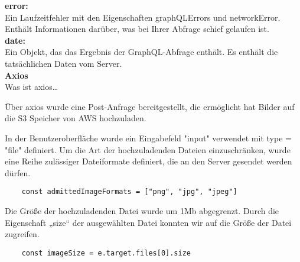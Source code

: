 \textbf{error:}\\
Ein Laufzeitfehler mit den Eigenschaften graphQLErrors und networkError.
Enthält Informationen darüber, was bei Ihrer Abfrage schief gelaufen ist.
\\

\textbf{date:}\\
Ein Objekt, das das Ergebnis der GraphQL-Abfrage enthält.
Es enthält die tatsächlichen Daten vom Server. 
\\


\textbf{Axios} \\

Was ist axios…

Über axios wurde eine Post-Anfrage bereitgestellt, die ermöglicht hat Bilder auf die S3 Speicher von AWS hochzuladen.

In der Benutzeroberfläche wurde ein Eingabefeld "input" verwendet mit type = "file" definiert.
Um die Art der hochzuladenden Dateien einzuschränken, wurde eine Reihe zulässiger Dateiformate definiert, die an den Server gesendet werden dürfen.
\\

\begin{lstlisting}
    const admittedImageFormats = ["png", "jpg", "jpeg"]
\end{lstlisting}
\newline

Die Größe der hochzuladenden Datei wurde um 1Mb abgegrenzt.
Durch die Eigenschaft „size“ der ausgewählten Datei konnten wir auf die Größe der Datei zugreifen.

\begin{lstlisting}
    const imageSize = e.target.files[0].size
\end{lstlisting}